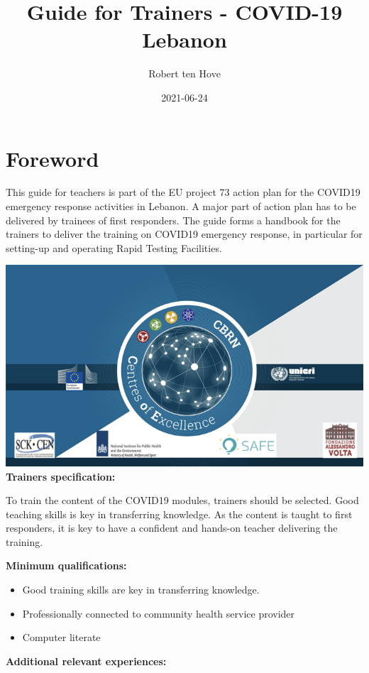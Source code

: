 \documentclass[
]{book}
\title{Guide for Trainers - COVID-19 Lebanon}
\author{Robert ten Hove}
\date{2021-06-24}
\begin{document}
\maketitle

{
\setcounter{tocdepth}{1}
\tableofcontents
}
\hypertarget{foreword}{%
\chapter{Foreword}\label{foreword}}

This guide for teachers is part of the EU project 73 action plan for the
COVID19 emergency response activities in Lebanon. A major part of action
plan has to be delivered by trainees of first responders. The guide
forms a handbook for the trainers to deliver the training on COVID19
emergency response, in particular for setting-up and operating Rapid Testing Facilities.

\includegraphics{images/CoE.jpeg}\\
\textbf{Trainers specification:}

To train the content of the COVID19 modules, trainers should be
selected. Good teaching skills is key in transferring knowledge. As the
content is taught to first responders, it is key to have a confident and
hands-on teacher delivering the training.

\textbf{Minimum qualifications:}

\begin{itemize}
\item
  Good training skills are key in transferring knowledge.
\item
  Professionally connected to community health service provider
\item
  Computer literate
\end{itemize}

\textbf{Additional relevant experiences:}
\end{document}
